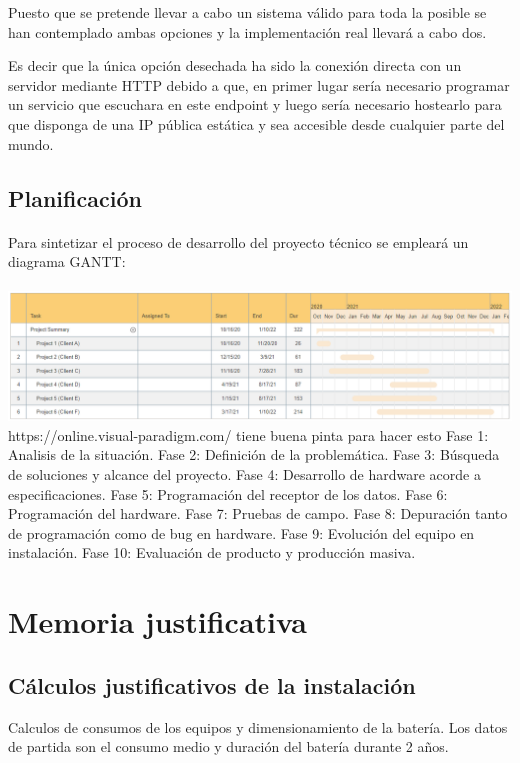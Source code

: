 \documentclass[a4paper ,12pt, onecolumn]{article}
\begin{document}
        Puesto que se pretende llevar a cabo un sistema válido para toda la posible se han contemplado ambas opciones
        y la implementación real llevará a cabo dos.
        
        Es decir que la única opción desechada ha sido la conexión directa con un servidor mediante HTTP debido a que, en primer
        lugar sería necesario programar un servicio que escuchara en este endpoint y luego sería necesario hostearlo 
        para que disponga de una IP pública estática y sea accesible desde cualquier parte del mundo.
    \subsection{Planificación}
        \paragraph{}
        Para sintetizar el proceso de desarrollo del proyecto técnico se empleará un diagrama GANTT: 
        \paragraph{}
        \includegraphics[scale=0.3]{gantt.PNG}
        https://online.visual-paradigm.com/ tiene buena pinta para hacer esto
        Fase 1: Analisis de la situación.
        Fase 2: Definición de la problemática.
        Fase 3: Búsqueda de soluciones y alcance del proyecto.
        Fase 4: Desarrollo de hardware acorde a especificaciones.
        Fase 5: Programación del receptor de los datos.
        Fase 6: Programación del hardware.
        Fase 7: Pruebas de campo.
        Fase 8: Depuración tanto de programación como de bug en hardware.
        Fase 9: Evolución del equipo en instalación.
        Fase 10: Evaluación de producto y producción masiva.
\section{Memoria justificativa}
    \subsection{Cálculos justificativos de la instalación}
        Calculos de consumos de los equipos y dimensionamiento de la batería.
        Los datos de partida son el consumo medio y duración del batería durante 2 años.
\end{document}
